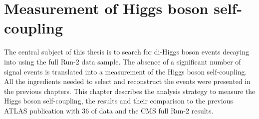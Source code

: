 \newpage
\chapter{Measurement of Higgs boson self-coupling}
\label{HHyybb}

The central subject of this thesis is to search for di-Higgs boson events decaying into \HHyybb using the full Run-2 data sample. The absence of a significant number of signal events is translated into a measurement of the Higgs boson self-coupling. All the ingredients needed to select and reconstruct the \HHyybb events were presented in the previous chapters. This chapter describes the analysis strategy to measure the Higgs boson self-coupling, the results and their comparison to the previous ATLAS publication with 36 \ifb of data and the CMS full Run-2 results.  

